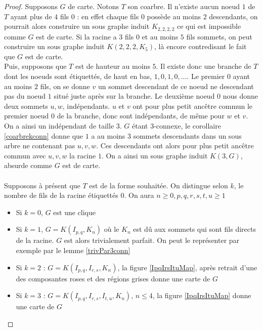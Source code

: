 \documentclass{scrartcl}
\begin{document}
\begin{flushleft}
\begin{proof}
    Supposons $G$ de carte. Notons $T$ son coarbre. Il n'existe aucun noeud $1$ de $T$ ayant plus de $4$ fils $0$ : en effet chaque fils $0$
    possède au moins $2$ descendants, on pourrait alors construire un sous graphe induit $K_{2,2,2,2}$ ce qui est impossible comme $G$ est de carte.
    Si la racine a $3$ fils $0$ et au moins $5$ fils sommets, on peut construire un sous graphe induit $K(2,2,2,K_5)$, là encore contredisant
    le fait que $G$ est de carte.\\
    Puis, supposons que $T$ est de hauteur au moins $5$. Il existe donc une branche de $T$ dont les noeuds sont étiquettés, de haut en bas,
    $1, 0, 1, 0, ...$. Le premier $0$ ayant au moins $2$ fils, on se donne $v$ un sommet descendant de ce noeud ne descendant pas
    du noeud $1$ situé juste après sur la branche. Le deuxième noeud $0$ nous donne deux sommets $u, w$, indépendants. $u$ et $v$ ont pour
    plus petit ancêtre commun le premier noeud $0$ de la branche, donc sont indépendants, de même pour $w$ et $v$. On a ainsi un indépendant
    de taille $3$. $G$ étant $3$-connexe, le corollaire \ref{coarbrekconn} donne que $1$ a au moins $3$ sommets descendants dans un sous arbre ne
    contenant pas $u,v,w$. Ces descendants ont alors pour plus petit ancêtre commun avec $u,v,w$ la racine $1$.
    On a ainsi un sous graphe induit $K(3, G)$, absurde comme $G$ est de carte.
    \\~\\
    Supposons à présent que $T$ est de la forme souhaitée. On distingue selon $k$, le nombre de fils de la racine étiquettés $0$.
    On aura $n \geq 0, p,q,r,s,t,u \geq 1$
    \begin{itemize}
        \item Si $k = 0$, $G$ est une clique
        \item Si $k = 1$, $G = K(I_{p,q}, K_n)$ où le $K_n$ est dû aux sommets qui sont fils directs de la racine.
        $G$ est alors trivialement parfait. On peut le représenter par exemple par le lemme \ref{trivPar3conn}
        \item Si $k = 2$ : $G = K(I_{p,q}, I_{r,s}, K_n)$, la figure \ref{IpqIrsItuMap}, après retrait d'une des composantes roses et des régions
        grises donne une carte de $G$
        \item Si $k = 3$ : $G = K(I_{p,q}, I_{r,s}, I_{t,u}, K_n)$, $n \leq 4$, la figure \ref{IpqIrsItuMap} donne une carte de $G$
    \end{itemize}
\end{proof}


\end{flushleft}
\end{document}
